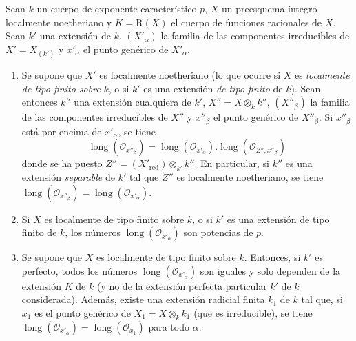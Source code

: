 \begin{proposition}[4.7.3]
Sean $k$ un cuerpo de exponente característico $p$, $X$ un preesquema íntegro
localmente noetheriano y $K=\mathrm R(X)$ el cuerpo de funciones racionales de
$X$. Sean $k'$ una extensión de $k$, $(X'_\alpha)$ la familia de las
componentes irreducibles de $X'=X_{(k')}$ y $x'_\alpha$ el punto genérico de
$X'_\alpha$.
\begin{enumerate}
\item[\textup{(i)}] Se supone que $X'$ es localmente noetheriano \textup{(lo que ocurre si $X$
es \emph{localmente de tipo finito sobre} $k$, o si $k'$ es una extensión \emph{de tipo
finito} de $k$)}. Sean entonces $k''$ una extensión cualquiera de $k'$,
$X''=X\otimes_k k''$, $(X''_\beta)$ la familia de las componentes irreducibles
de $X''$ y $x''_\beta$ el punto genérico de $X''_\beta$. Si $x''_\beta$ está por
encima de $x'_\alpha$, se tiene
\begin{equation}
\operatorname{long}(\mathcal O_{x''_\beta})
=\operatorname{long}(\mathcal O_{x'_\alpha})
 .\operatorname{long}(\mathcal O_{Z'',x''_\beta})
\tag{4.7.3.1}
\label{IV.2.4.7.3.1-fr}
\end{equation}
donde se ha puesto $Z''=(X'_{\mathrm{red}})\otimes_{k'}k''$. En particular, si
$k''$ es una extensión \emph{separable} de $k'$ tal que $Z''$ es localmente
noetheriano, se tiene
$\operatorname{long}(\mathcal O_{x''_\beta})
=\operatorname{long}(\mathcal O_{x'_\alpha})$.


\item[\textup{(ii)}] Si $X$ es localmente de tipo finito sobre $k$, o si $k'$ es una
extensión de tipo finito de $k$, los números
$\operatorname{long}(\mathcal O_{x'_\alpha})$ son potencias de $p$.

\item[\textup{(iii)}] Se supone que $X$ es localmente de tipo finito sobre $k$.
Entonces, si $k'$ es perfecto, todos los números
$\operatorname{long}(\mathcal O_{x'_\alpha})$ son iguales y solo dependen de la
extensión $K$ de $k$ \textup{(y no de la extensión perfecta particular $k'$ de $k$
considerada)}. Además, existe una extensión radicial finita $k_1$ de $k$ tal
que, si $x_1$ es el punto genérico de $X_1=X\otimes_k k_1$ (que es
irreducible), se tiene
$\operatorname{long}(\mathcal O_{x'_\alpha})
=\operatorname{long}(\mathcal O_{x_1})$ para todo $\alpha$.
\end{enumerate}
\end{proposition}

